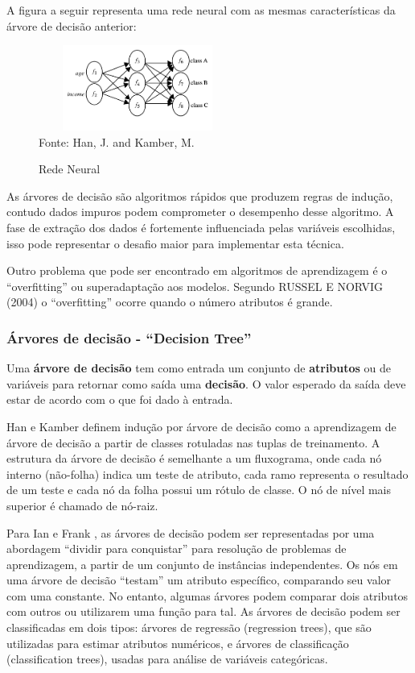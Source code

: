\documentclass[conference,compsoc]{IEEEtran}
\begin{document}
A figura a seguir representa uma rede neural com as mesmas características da árvore de decisão anterior:
\begin{figure}[!ht]
\centering
\caption{Rede Neural}
\includegraphics[width=65mm, height=28mm]{Figuras/redeneural.png}\\
\tiny Fonte: Han, J. and Kamber, M. 
\end{figure}  

As árvores de decisão são algoritmos rápidos que produzem regras de indução, contudo dados impuros podem comprometer o desempenho desse algoritmo. 
A fase de extração dos dados é fortemente influenciada pelas variáveis escolhidas, \cite{DecisionTree} 
isso pode representar o desafio maior para implementar esta técnica.

Outro problema que pode ser encontrado em algoritmos de aprendizagem é o ``overfitting'' ou superadaptação aos modelos.
Segundo RUSSEL E NORVIG (2004) o ``overfitting'' ocorre quando o número atributos é grande.

\subsubsection{Árvores de decisão - ``Decision Tree''}

Uma \textbf{árvore de decisão} tem como entrada um conjunto de \textbf{atributos} ou de variáveis para retornar como saída uma \textbf{decisão}.
O valor esperado da saída deve estar de acordo com o que foi dado à entrada.


Han e Kamber \cite{DataMining} definem indução por árvore de decisão como a aprendizagem de árvore de decisão a partir de classes rotuladas nas tuplas de treinamento. 
A estrutura da árvore de decisão é semelhante a um fluxograma, onde cada nó interno (não-folha) indica um teste de atributo, cada ramo representa o resultado de um teste e 
cada nó da folha possui um rótulo de classe. O nó de nível mais superior é chamado de nó-raiz.


Para Ian e Frank \cite{MachineLearning}, as árvores de decisão podem ser representadas por uma abordagem ``dividir para conquistar'' para resolução de problemas de 
aprendizagem, a partir de um conjunto de instâncias independentes. Os nós em uma árvore de decisão ``testam'' um atributo específico, comparando seu valor com uma constante.
No entanto, algumas árvores podem comparar dois atributos com outros ou utilizarem uma função para tal.
As árvores de decisão podem ser classificadas em dois tipos: árvores de regressão (regression trees), que são utilizadas para estimar atributos numéricos, e árvores de 
classificação (classification trees), usadas para análise de variáveis categóricas.
 
\end{document}
